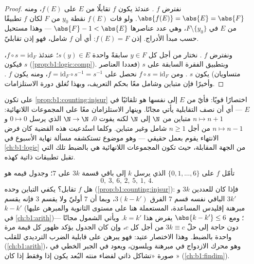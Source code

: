 \begin{proof}
نفترض $f$ . عندئذ يكون $f$ تقابلًا من $E$ على $f(E)$،
ومنه $\abs{f(E)} = \abs{E} = \abs{F}$. ولو فات $f(E)$ نقطة $y_0$ من
$F$ لكان $f$ تطبيقًا  من $E$ في $F \setminus \{y_0\}$،
وهي  عدد عناصرها $\abs{F} - 1 < \abs{E}$ --- وهذا مستحيل حسب
مبدأ الأدراج. إذن $f(E) = F$: أي أن $f$ شامل، فهو إذن
تقابليّ.

ونفترض $f$ . نختار من أجل كل $y \in F$ سابقةً واحدة $s(y)
\in E$؛ عندئذ $f \circ s = \mathrm{id}_F$، فيكون $s$ 
(\cref{prop:b1:logic:comp}). وبتطبيق الفقرة السابقة على $s$
(فعددا العناصر متساويان) يكون $s$ . ومن $f \circ s =
\mathrm{id}_F$ نحصل على $f = \mathrm{id}_F \circ s^{-1} = s^{-1}$، ومنه
يكون $f$ . وأخيرًا فإن  متباين وشامل معًا
بحكم التعريف، وبهذا تُغلق دورة الاستلزامات.
\end{proof}

\begin{example}\label{ex:b1:counting:finiteonly}
على  \emph{} تكون \cref{prop:b1:counting:injsur} اختصارًا
قويًا: فأيّ  من $E$ إلى نفسها هو تلقائيًا  في $E$ --- أي أن نصف التقابلية يأتي مجانًا. وينهار الاستلزامان معًا
على المجموعات اللانهائية:  $n \mapsto n + 1$ متباين من
$\N$ إلى $\N$ لكنه يفوت $0$،  $\N \to \N$ الذي يرسل
$0 \mapsto 0$ و $n \mapsto n - 1$ من أجل $n \geq 1$ شامل وغير
متباين. وكلما استُدعيت هذه القضية كان فرض الانتهاء يقوم بعمل
حقيقي --- وهو موضوع تستكشفه مسألة نهاية الأسبوع في \cref{ch:b1:logic}
من الجهة المقابلة، حيث تكون المجموعات اللانهائية هي بالضبط تلك
التي تقبل تطبيقات ذاتية كهذه.
\end{example}

\begin{example}\label{ex:b1:counting:mod7}
تأمّل  $f$ على $\{0, 1, \dots, 6\}$ الذي يرسل $k$ إلى
باقي قسمة $3k$ على $7$؛ وجدول قيمه هو
\[
0,\ 3,\ 6,\ 2,\ 5,\ 1,\ 4 .
\]
هل $f$ تقابل؟ يكفي التباين وحده
(\cref{prop:b1:counting:injsur}): فإذا كان للعددين $3k$ و $3k'$ الباقي نفسه قسم $7$ الفرق $3(k - k')$، وبما أن $7$ أوليّ ولا يقسم
$3$ فإنه يقسم $k - k'$ (مبرهنة إقليدس المساعدة، المستعملة هنا
على مستوى الثانوية والمبرهن عليها في \cref{ch:b1:arith})؛ ومع
$\abs{k - k'} \leq 6$ يفرض هذا $k = k'$. ويأتي الشمول
مجانًا --- دون حاجة إلى حلّ $3k \equiv c$ من أجل كل $c$، وإن
كان الجدول يؤكد ظهور كل قيمة مرة واحدة بالضبط. وهذا الاختصار
عتيد: فهو يبرهن على قابلية الضرب الترديدي للقلب
(\cref{ch:b1:arith})، وهو محرك الازدواج في مبرهنة
ويلسون، ويعود في الجبر الخطي في صورة «تشاكل ذاتي لفضاء منته
البُعد يكون  إذا وفقط إذا كان »
(\cref{ch:b1:findim}).
\end{example}

